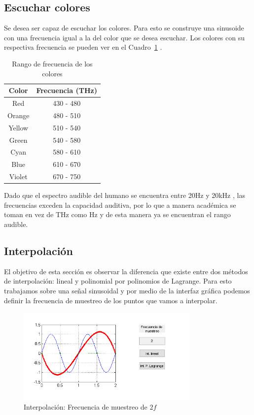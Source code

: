 \documentclass[comsoc, journal]{IEEEtran}
\begin{document}
\subsection{Escuchar colores}
Se desea ser capaz de escuchar los colores. Para esto se construye una sinusoide con una frecuencia igual a la del color que se desea escuchar. Los colores con su respectiva frecuencia se pueden ver en el Cuadro~\ref{table_color} \cite{bohren}.

\begin{table}[!t]
    \renewcommand{\arraystretch}{1.3}
    \caption{Rango de frecuencia de los colores}
    \label{table_color}
    \centering
    \begin{tabular}{|c|c|}
        \hline
        Color & Frecuencia (THz)\\
        \hline
        Red	    & 430 - 480\\
        \hline
        Orange	& 480 - 510\\
        \hline
        Yellow	& 510 - 540\\
        \hline
        Green	& 540 - 580\\
        \hline
        Cyan	& 580 - 610\\
        \hline
        Blue	& 610 - 670\\
        \hline
        Violet	& 670 - 750\\
        \hline
    \end{tabular}
\end{table}

Dado que el espectro audible del humano se encuentra entre 20Hz y 20kHz \cite{rosen}, las frecuencias exceden la capacidad auditiva, por lo que a manera académica se toman en vez de THz como Hz y de esta manera ya se encuentran el rango audible.

\subsection{Interpolación}

El objetivo de esta sección es observar la diferencia que existe entre dos métodos de interpolación: lineal y polinomial por polinomios de Lagrange. Para esto trabajamos sobre una señal sinusoidal y por medio de la interfaz gráfica podemos definir la frecuencia de muestreo de los puntos que vamos a interpolar.


\begin{figure}[!t]
\centering
\includegraphics[width=3.5in]{imgs/inter2.png}
\caption{Interpolación: Frecuencia de muestreo de $2f$}
\label{fig_inter_2}
\end{figure}
\end{document}

